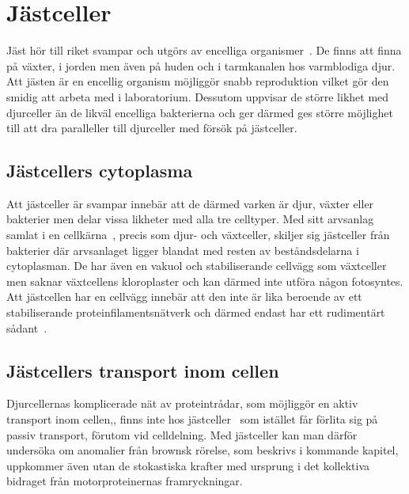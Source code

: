 

\section{Jästceller}

Jäst hör till riket svampar och utgörs av encelliga organismer~\cite{SGD_yeast}.
De finns att finna på växter, i jorden men även på huden och i tarmkanalen hos varmblodiga djur. 
Att jästen är en encellig organism möjliggör snabb reproduktion vilket gör den smidig att arbeta med i laboratorium. Dessutom uppvisar de större likhet med djurceller än de likväl encelliga bakterierna och ger därmed ges större möjlighet till att dra paralleller till djurceller med försök på jästceller. 

\subsection{Jästcellers cytoplasma}
Att jästceller är svampar innebär att de därmed varken är djur, växter eller bakterier men delar vissa likheter med alla tre celltyper. Med sitt arvsanlag samlat i en cellkärna~\cite{SGD_yeast}, precis som djur- och växtceller, skiljer sig jästceller från bakterier där arvsanlaget ligger blandat med resten av beståndsdelarna i cytoplasman.
De har även en vakuol och stabiliserande cellvägg som växtceller men saknar växtcellens kloroplaster och kan därmed inte utföra någon fotosyntes. Att jästcellen har en cellvägg innebär att den inte är lika beroende av ett stabiliserande proteinfilamentsnätverk och därmed endast har ett rudimentärt sådant~\cite{Midtveldt_etal2016}.

\subsection{Jästcellers transport inom cellen}
Djurcellernas komplicerade nät av proteintrådar, som möjliggör en aktiv transport inom cellen,, finns inte hos jästceller~\cite{Midtveldt_etal2016} som istället får förlita sig på passiv transport, förutom vid celldelning. 
Med jästceller kan man därför undersöka om anomalier från brownsk rörelse, som beskrivs i kommande kapitel, uppkommer även utan de stokastiska krafter med ursprung i det kollektiva bidraget från motorproteinernas framryckningar.




